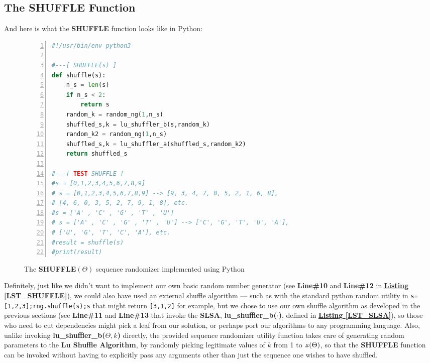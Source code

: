 \documentclass[a4paper, 18pt]{book} %
\newcommand{\invpi}{\rotatebox[origin=c]{180}{$\pi$}}
\begin{document}
\subsection{The SHUFFLE Function}

And here is what the \textbf{SHUFFLE} function looks like in Python:

\begin{figure}[H]
  \begin{center}
  \begin{lstlisting}[caption={The SHUFFLE}, label={LST_SHUFFLE}, language=Python, frame=single, numbers=left, basicstyle=\ttfamily,  commentstyle=\color{blue}]
#!/usr/bin/env python3

#---[ SHUFFLE(s) ]
def shuffle(s):
    n_s = len(s)
    if n_s < 2:
        return s
    random_k = random_ng(1,n_s)
    shuffled_s,k = lu_shuffler_b(s,random_k)
    random_k2 = random_ng(1,n_s)
    shuffled_s,k = lu_shuffler_a(shuffled_s,random_k2)
    return shuffled_s

#---[ TEST SHUFFLE ]
#s = [0,1,2,3,4,5,6,7,8,9]
# s = [0,1,2,3,4,5,6,7,8,9] --> [9, 3, 4, 7, 0, 5, 2, 1, 6, 8], 
# [4, 6, 0, 3, 5, 2, 7, 9, 1, 8], etc.
#s = ['A' , 'C' , 'G' , 'T' , 'U']
# s = ['A' , 'C' , 'G' , 'T' , 'U'] --> ['C', 'G', 'T', 'U', 'A'], 
# ['U', 'G', 'T', 'C', 'A'], etc.
#result = shuffle(s)
#print(result)
\end{lstlisting}
  \end{center}
  \caption{The \textbf{SHUFFLE}$(\Theta)$ sequence randomizer implemented using Python}
\end{figure}

Definitely, just like we didn't want to implement our own basic random number generator (see \textbf{Line\#10} and \textbf{Line\#12} in \textbf{\hyperref[LST_SHUFFLE]{Listing \ref{LST_SHUFFLE}}}), we could also have used an external shuffle algorithm --- such as with the standard python random utility in \texttt{s=[1,2,3];rng.shuffle(s);s} that might return \texttt{[3,1,2]} for example, but we chose to use our own shuffle algorithm as developed in the previous sections (see \textbf{Line\#11} and \textbf{Line\#13} that invoke the \textbf{SLSA}, \textbf{lu\_shuffler\_b($\cdot$)}, defined in \textbf{\hyperref[LST_SLSA]{Listing \ref{LST_SLSA}}}), so those who need to cut dependencies might pick a leaf from our solution, or perhaps port our algorithms to any programming language. Also, unlike invoking  \textbf{lu\_shuffler\_b($\Theta, k$)} directly, the provided sequence randomizer utility function takes care of generating random parameters to the \textbf{Lu Shuffle Algorithm}, by randomly picking legitimate values of $k$ from 1 to $\invpi(\Theta)$, so that the \textbf{SHUFFLE} function can be invoked without having to explicitly pass any arguments other than just the sequence one wishes to have shuffled.
\end{document}

